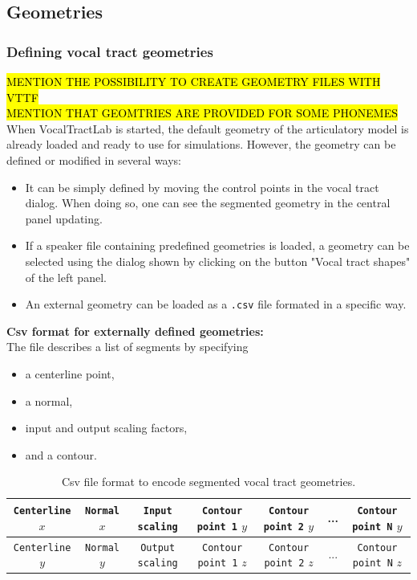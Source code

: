 \documentclass[]{article}
\begin{document}
	\subsection{Geometries}

	\subsubsection{Defining vocal tract geometries}
	
	\hl{MENTION THE POSSIBILITY TO CREATE GEOMETRY FILES WITH VTTF} \\
	
	\hl{MENTION THAT GEOMTRIES ARE PROVIDED FOR SOME PHONEMES} \\
	
	When VocalTractLab is started, the default geometry of the articulatory model is already loaded and ready to use for 
	simulations.
	However, the geometry can be defined or modified in several ways:
	\begin{itemize}
		\item It can be simply defined by moving the control points in
		the vocal tract dialog. When doing so, one can see the segmented 
		geometry in the central panel updating.
		\item If a speaker file containing predefined geometries is loaded, a geometry can be selected using the dialog shown by 
		clicking on the button "Vocal tract shapes" of the left panel.
		\item An external geometry can be loaded as a \texttt{.csv} file
		formated in a specific way. 
	\end{itemize}

	\textbf{Csv format for externally defined geometries:}\\
	The file describes a list of segments by specifying
	\begin{itemize}
		\item a centerline point,
		\item a normal,
		\item input and output scaling factors,
		\item and a contour.
	\end{itemize}

	\begin{table}[h!]
		\centering
		\begin{tabular}{c c c c c c c}
			\hline
			\texttt{Centerline} $x$ & \texttt{Normal} $x$ & 
			\texttt{Input scaling} & \texttt{Contour point 1} $y$ &  
			\texttt{Contour point 2} $y$ & ... 
			& \texttt{Contour point N} $y$ \\
			\hline
			\texttt{Centerline} $y$ & \texttt{Normal} $y$ & 
			\texttt{Output scaling} & \texttt{Contour point 1} $z$ &  
			\texttt{Contour point 2} $z$ & ... 
			& \texttt{Contour point N} $z$ \\
			\hline
		\end{tabular}
		\caption{Csv file format to encode segmented vocal tract geometries.}
		\label{table:csv_file_format}
	\end{table}
\end{document}
